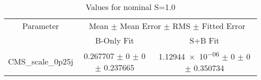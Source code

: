 \begin{table}
\centering
\caption{Values for nominal S=1.0}
\begin{tabular}{ccc}
\toprule
Parameter & \multicolumn{2}{c}{Mean $\pm$ Mean Error $\pm$ RMS $\pm$ Fitted Error}\\
 & B-Only Fit & S+B Fit\\
\midrule
CMS\_scale\_0p25j & \num{0.267707} $\pm$ \num{0} $\pm$ \num{0} $\pm$ \num{0.237665} & \num{1.12944e-06} $\pm$ \num{0} $\pm$ \num{0} $\pm$ \num{0.350734}\\
\bottomrule
\end{tabular}
\end{table}